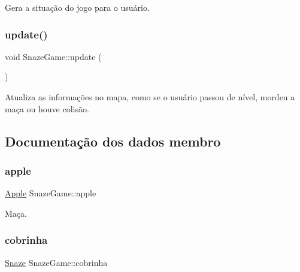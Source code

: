 Gera a situação do jogo para o usuário. 

\mbox{\label{classSnazeGame_a288103ac611e57f980d595bca35e399a}} 
\subsubsection{\texorpdfstring{update()}{update()}}
{\footnotesize\ttfamily void Snaze\+Game\+::update (\begin{DoxyParamCaption}{ }\end{DoxyParamCaption})\hspace{0.3cm}{\ttfamily [inline]}}



Atualiza as informações no mapa, como se o usuário passou de nível, mordeu a maça ou houve colisão. 



\subsection{Documentação dos dados membro}
\mbox{\label{classSnazeGame_a346b1696a5d5807c012e4b24bbba1e8b}} 
\subsubsection{\texorpdfstring{apple}{apple}}
{\footnotesize\ttfamily \hyperlink{classApple}{Apple} Snaze\+Game\+::apple\hspace{0.3cm}{\ttfamily [private]}}



Maça. 

\mbox{\label{classSnazeGame_a86f1f0364ec7e8fe6559418236ea7e04}} 
\subsubsection{\texorpdfstring{cobrinha}{cobrinha}}
{\footnotesize\ttfamily \hyperlink{classSnaze}{Snaze} Snaze\+Game\+::cobrinha\hspace{0.3cm}{\ttfamily [private]}}



